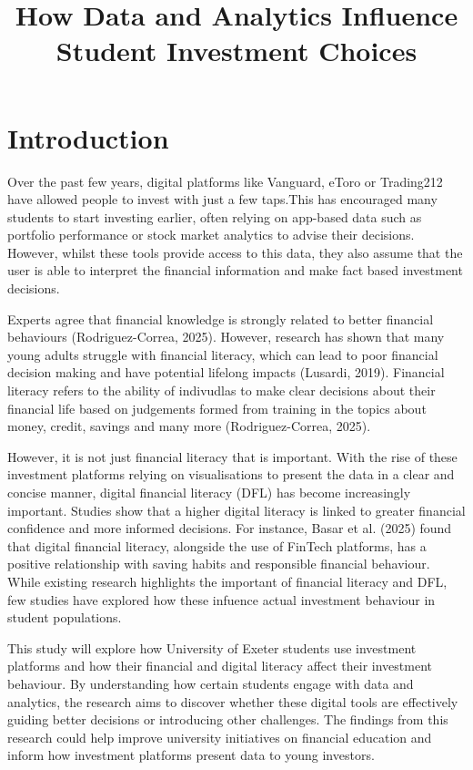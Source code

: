 \documentclass[english]{article}
\begin{document}

\title{\bf How Data and Analytics Influence Student Investment Choices}
\date{}
\maketitle
\thispagestyle{fancy}

\section{Introduction}
Over the past few years, digital platforms like Vanguard, eToro or Trading212 have allowed people to invest
with just a few taps.This has encouraged many students to start investing earlier, 
often relying on app-based data such as portfolio performance or stock market analytics to advise their decisions.
However, whilst these tools provide access to this data, they also assume that the user is able to interpret 
the financial information and make fact based investment decisions.

Experts agree that financial knowledge is strongly related to better financial behaviours
(Rodriguez-Correa, 2025). However, research has shown that many young adults struggle
with financial literacy, which can lead to poor financial decision making and have potential lifelong 
impacts (Lusardi, 2019). Financial literacy refers to the ability of indivudlas to make clear decisions 
about their financial life based on judgements formed from training in the topics about money, credit, 
savings and many more (Rodriguez-Correa, 2025).

However, it is not just financial literacy that is important. With the rise of these investment platforms relying on
visualisations to present the data in a clear and concise manner, digital financial literacy (DFL) has become increasingly important.
Studies show that a higher digital literacy is linked to greater financial confidence and more informed decisions. 
For instance, Basar et al. (2025) found that digital financial literacy, alongside the use of FinTech platforms, 
has a positive relationship with saving habits and responsible financial behaviour. 
While existing research highlights the important of financial literacy and DFL, few studies have explored how these
infuence actual investment behaviour in student populations.

This study will explore how University of Exeter students use investment platforms and how their financial
and digital literacy affect their investment behaviour. By understanding how certain students engage with data 
and analytics, the research aims to discover whether these digital tools are effectively guiding better decisions or
introducing other challenges. The findings from this research could help improve university initiatives on financial
education and inform how investment platforms present data to young investors.
\end{document}
